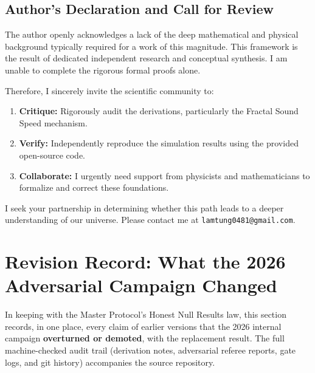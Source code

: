 \documentclass[a4paper,12pt]{article}
\begin{document}
\subsection{Author's Declaration and Call for Review}
The author openly acknowledges a lack of the deep mathematical and physical background typically required for a work of this magnitude. This framework is the result of dedicated independent research and conceptual synthesis. I am unable to complete the rigorous formal proofs alone.

Therefore, I sincerely invite the scientific community to:
\begin{enumerate}
    \item \textbf{Critique:} Rigorously audit the derivations, particularly the Fractal Sound Speed mechanism.
    \item \textbf{Verify:} Independently reproduce the simulation results using the provided open-source code.
    \item \textbf{Collaborate:} I urgently need support from physicists and mathematicians to formalize and correct these foundations.
\end{enumerate}

I seek your partnership in determining whether this path leads to a deeper understanding of our universe. Please contact me at \texttt{lamtung0481@gmail.com}.




\section{Revision Record: What the 2026 Adversarial Campaign Changed}
\label{sec:revisionrecord}

In keeping with the Master Protocol's Honest Null Results law, this section records, in one
place, every claim of earlier versions that the 2026 internal campaign \textbf{overturned or
demoted}, with the replacement result. The full machine-checked audit trail (derivation
notes, adversarial referee reports, gate logs, and git history) accompanies the source
repository.
\end{document}
